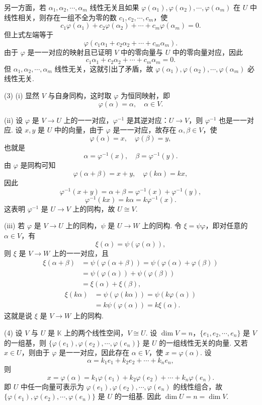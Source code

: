 \documentclass[UTF8, 12pt, fontset=fandol, oneside]{ctexart}
\begin{document}
另一方面，若 $\alpha_1,\alpha_2,\cdots,\alpha_m$ 线性无关且如果 $\varphi(\alpha_1),\varphi(\alpha_2),\cdots,\varphi(\alpha_m)$ 在 $U$ 中线性相关，则存在一组不全为零的数 $c_1,c_2,\cdots,c_m$，使
\[
c_1\varphi(\alpha_1)+c_2\varphi(\alpha_2)+\cdots+c_m\varphi(\alpha_m)=0.
\]
但上式左端等于
\[
\varphi(c_1\alpha_1+c_2\alpha_2+\cdots+c_m\alpha_m).
\]
由于 $\varphi$ 是一一对应的映射且已证明 $V$ 中的零向量与 $U$ 中的零向量对应，因此
\[
c_1\alpha_1+c_2\alpha_2+\cdots+c_m\alpha_m=0.
\]
但 $\alpha_1,\alpha_2,\cdots,\alpha_m$ 线性无关，这就引出了矛盾，故 $\varphi(\alpha_1),\varphi(\alpha_2),\cdots,\varphi(\alpha_m)$ 必线性无关.

(3) (i) 显然 $V$ 与自身同构，这时取 $\varphi$ 为恒同映射，即
\[
\varphi(\alpha)=\alpha,\quad \alpha\in V.
\]

(ii) 设 $\varphi$ 是 $V\to U$ 上的一一对应，$\varphi^{-1}$ 是其逆对应：$U\to V$，则 $\varphi^{-1}$ 也是一一对应. 设 $x,y$ 是 $U$ 中的向量，由于 $\varphi$ 是一一对应，故存在 $\alpha,\beta\in V$，使
\[
\varphi(\alpha)=x,\quad \varphi(\beta)=y,
\]
也就是
\[
\alpha=\varphi^{-1}(x),\quad \beta=\varphi^{-1}(y).
\]
由 $\varphi$ 是同构可知
\[
\varphi(\alpha+\beta)=x+y,\quad \varphi(k\alpha)=kx,
\]
因此
\[
\varphi^{-1}(x+y)=\alpha+\beta=\varphi^{-1}(x)+\varphi^{-1}(y),
\]
\[
\varphi^{-1}(kx)=k\alpha=k\varphi^{-1}(x).
\]
这表明 $\varphi^{-1}$ 是 $U\to V$ 上的同构，故 $U\cong V$.

(iii) 若 $\varphi$ 是 $V\to U$ 上的同构，$\psi$ 是 $U\to W$ 上的同构. 令 $\xi=\psi\varphi$，即对任意的 $\alpha\in V$，有
\[
\xi(\alpha)=\psi(\varphi(\alpha)),
\]
则 $\xi$ 是 $V\to W$ 上的一一对应，且
\[
\begin{aligned}
\xi(\alpha+\beta)&=\psi(\varphi(\alpha+\beta))=\psi(\varphi(\alpha)+\varphi(\beta))\\
&=\psi(\varphi(\alpha))+\psi(\varphi(\beta))\\
&=\xi(\alpha)+\xi(\beta),
\end{aligned}
\]
\[
\begin{aligned}
\xi(k\alpha)&=\psi(\varphi(k\alpha))=\psi(k\varphi(\alpha))\\
&=k\psi(\varphi(\alpha))=k\xi(\alpha).
\end{aligned}
\]
这就是说 $\xi$ 是 $V\to W$ 上的同构.

(4) 设 $V$ 与 $U$ 是 $\mathbb{K}$ 上的两个线性空间，$V\cong U$. 设 $\dim V=n$，$\{e_1,e_2,\cdots,e_n\}$ 是 $V$ 的一组基，则 $\{\varphi(e_1),\varphi(e_2),\cdots,\varphi(e_n)\}$ 是 $U$ 的一组线性无关的向量. 又若 $x\in U$，则由于 $\varphi$ 是一一对应，因此存在 $\alpha\in V$，使 $x=\varphi(\alpha)$. 设
\[
\alpha=k_1e_1+k_2e_2+\cdots+k_ne_n,
\]
则
\[
x=\varphi(\alpha)=k_1\varphi(e_1)+k_2\varphi(e_2)+\cdots+k_n\varphi(e_n).
\]
即 $U$ 中任一向量可表示为 $\varphi(e_1),\varphi(e_2),\cdots,\varphi(e_n)$ 的线性组合，故 $\{\varphi(e_1),\varphi(e_2),\cdots,\varphi(e_n)\}$ 是 $U$ 的一组基. 因此 $\dim U=n=\dim V$.
\end{document}
